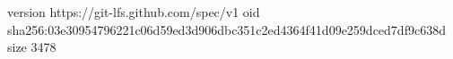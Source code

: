 version https://git-lfs.github.com/spec/v1
oid sha256:03e30954796221c06d59ed3d906dbc351c2ed4364f41d09e259dced7df9c638d
size 3478
